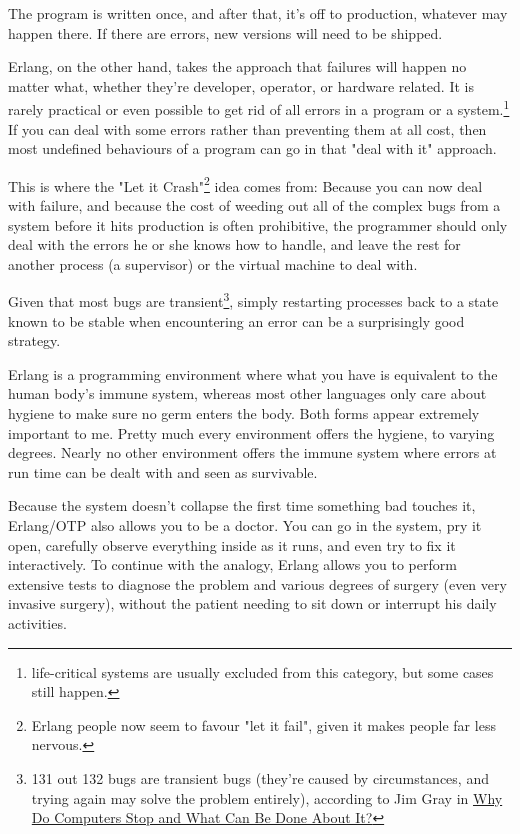 \documentclass[11pt, oneside]{book}   	%
\begin{document}
The program is written once, and after that, it's off to production, whatever may happen there. If there are errors, new versions will need to be shipped.

Erlang, on the other hand, takes the approach that failures will happen no matter what, whether they're developer, operator, or hardware related. It is rarely practical or even possible to get rid of all errors in a program or a system.\footnote{life-critical systems are usually excluded from this category, but some cases still happen.} If you can deal with some errors rather than preventing them at all cost, then most undefined behaviours of a program can go in that "deal with it" approach.

This is where the "Let it Crash"\footnote{Erlang people now seem to favour "let it fail", given it makes people far less nervous.} idea comes from: Because you can now deal with failure, and because the cost of weeding out all of the complex bugs from a system before it hits production is often prohibitive, the programmer should only deal with the errors he or she knows how to handle, and leave the rest for another process (a supervisor) or the virtual machine to deal with.

Given that most bugs are transient\footnote{131 out 132 bugs are transient bugs (they're caused by circumstances, and trying again may solve the problem entirely), according to Jim Gray in \href{http://www.hpl.hp.com/techreports/tandem/TR-85.7.html}{Why Do Computers Stop and What Can Be Done About It?}}, simply restarting processes back to a state known to be stable when encountering an error can be a surprisingly good strategy.

Erlang is a programming environment where what you have is equivalent to the human body's immune system, whereas most other languages only care about hygiene to make sure no germ enters the body. Both forms appear extremely important to me. Pretty much every environment offers the hygiene, to varying degrees. Nearly no other environment offers the immune system where errors at run time can be dealt with and seen as survivable.

Because the system doesn't collapse the first time something bad touches it, Erlang/OTP also allows you to be a doctor. You can go in the system, pry it open, carefully observe everything inside as it runs, and even try to fix it interactively. To continue with the analogy, Erlang allows you to perform extensive tests to diagnose the problem and various degrees of surgery (even very invasive surgery), without the patient needing to sit down or interrupt his daily activities.
\end{document}
